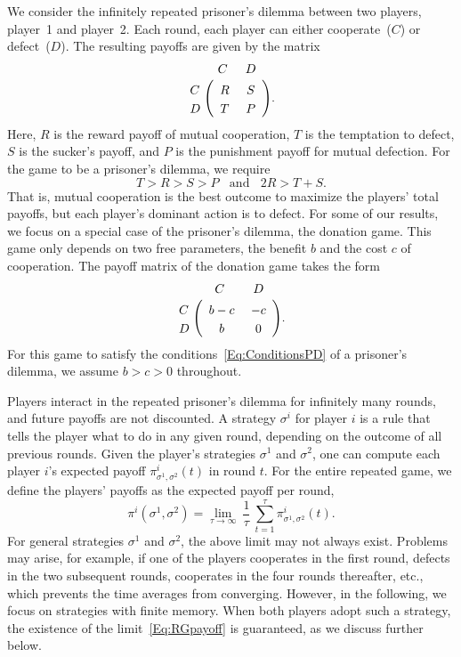 \documentclass[11pt]{article}
\theoremstyle{plainCl1}
\theoremstyle{plainCl2}
\begin{document}
We consider the infinitely repeated prisoner's dilemma between two players, player~1 and player~2.
Each round, each player can either cooperate~($C$) or defect~($D$). 
The resulting payoffs are given by the matrix 
\begin{align}\label{Eq:PrisonerDilemma}
  \bordermatrix{%
    & C & D \cr
    C &\ R &\ S\  \cr
    D &\ T &\ P\ \cr
  }.
\end{align}
Here, $R$ is the reward payoff of mutual cooperation, $T$ is the temptation to defect, $S$ is the sucker's payoff, and $P$ is the punishment payoff for mutual defection. For the game to be a prisoner's dilemma, we require
\begin{equation} \label{Eq:ConditionsPD}
 T > R > S > P ~~~~\text{and}~~~~ 2 R > T \!+\! S. 
\end{equation}
That is, mutual cooperation is the best outcome to maximize the players' total payoffs, but each player's dominant action is to defect. 
For some of our results, we focus on a special case of the prisoner's dilemma, the donation game. 
This game only depends on two free parameters, the benefit $b$ and the cost $c$ of cooperation. 
The payoff matrix of the donation game takes the form
\begin{align} \label{Eq:DonationGame}
  \bordermatrix{%
    & C & D \cr
    C &\ b - c &\ -c\  \cr
    D &\ b &\ 0\ \cr
  }.
\end{align}
For this game to satisfy the conditions~\eqref{Eq:ConditionsPD} of a prisoner's dilemma, we assume $b\!>\!c\!>\!0$ throughout. 

Players interact in the repeated prisoner's dilemma for infinitely many rounds, and future payoffs are not discounted. 
A strategy $\sigma^i$ for player $i$ is a rule that tells the player what to do in any given round, depending on the outcome of all previous rounds. 
Given the player's strategies $\sigma^1$ and $\sigma^2$, one can compute each player $i$'s expected payoff $\pi^i_{\sigma^1,\sigma^2}(t)$ in round $t$. 
For the entire repeated game, we define the players' payoffs as the expected payoff per round, 
\begin{equation} \label{Eq:RGpayoff}
\pi^i(\sigma^1,\sigma^2) = \lim_{\tau \to \infty}~ \frac{1}{\tau} ~\sum_{t=1}^{\tau} \pi_{\sigma^1,\sigma^2}^i(t).
\end{equation}
For general strategies $\sigma^1$ and $\sigma^2$, the above limit may not always exist. 
Problems may arise, for example, if one of the players cooperates in the first round, defects in the two subsequent rounds, cooperates in the four rounds thereafter, etc., which prevents the time averages from converging. 
However, in the following, we focus on strategies with finite memory. 
When both players adopt such a strategy, the existence of the limit~\eqref{Eq:RGpayoff} is guaranteed, as we discuss further below.
\end{document}

